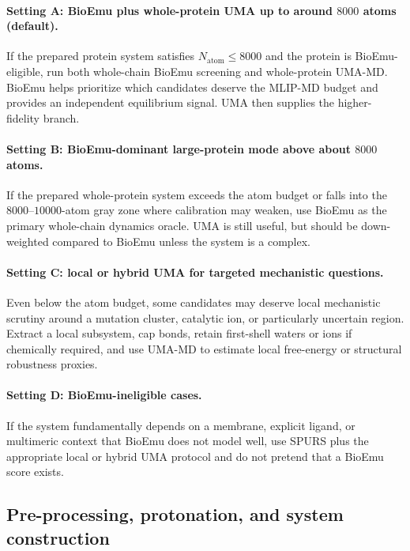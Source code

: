 \documentclass[11pt]{article}
\begin{document}
\paragraph{Setting A: BioEmu plus whole-protein UMA up to around $8000$ atoms (default).}
If the prepared protein system satisfies $N_{\mathrm{atom}}\leq 8000$ and the protein is BioEmu-eligible, run both whole-chain BioEmu screening and whole-protein UMA-MD. BioEmu helps prioritize which candidates deserve the MLIP-MD budget and provides an independent equilibrium signal. UMA then supplies the higher-fidelity branch.

\paragraph{Setting B: BioEmu-dominant large-protein mode above about $8000$ atoms.}
If the prepared whole-protein system exceeds the atom budget or falls into the $8000$--$10000$-atom gray zone where calibration may weaken, use BioEmu as the primary whole-chain dynamics oracle. UMA is still useful, but should be down-weighted compared to BioEmu unless the system is a complex. 

\paragraph{Setting C: local or hybrid UMA for targeted mechanistic questions.}
Even below the atom budget, some candidates may deserve local mechanistic scrutiny around a mutation cluster, catalytic ion, or particularly uncertain region. Extract a local subsystem, cap bonds, retain first-shell waters or ions if chemically required, and use UMA-MD to estimate local free-energy or structural robustness proxies.

\paragraph{Setting D: BioEmu-ineligible cases.}
If the system fundamentally depends on a membrane, explicit ligand, or multimeric context that BioEmu does not model well, use SPURS plus the appropriate local or hybrid UMA protocol and do not pretend that a BioEmu score exists.

\subsection{Pre-processing, protonation, and system construction}
\end{document}
